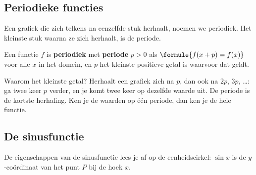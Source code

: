 \subsection{Periodieke functies}

Een grafiek die zich telkens na eenzelfde stuk herhaalt, noemen we periodiek. Het kleinste stuk waarna ze zich herhaalt, is de periode.

\begin{theorie}
Een functie $f$ is \textbf{\textcolor{accent}{periodiek}} met \textbf{\textcolor{accent}{periode}} $p > 0$ als $\formule{f(x + p) = f(x)}$ voor alle $x$ in het domein, en $p$ het kleinste positieve getal is waarvoor dat geldt.
\end{theorie}

Waarom het kleinste getal? Herhaalt een grafiek zich na $p$, dan ook na $2p$, $3p$, \ldots: ga twee keer $p$ verder, en je komt twee keer op dezelfde waarde uit. De periode is de kortste herhaling. Ken je de waarden op één periode, dan ken je de hele functie.


\begin{oefeningen}
\end{oefeningen}

\subsection{De sinusfunctie}

De eigenschappen van de sinusfunctie lees je af op de eenheidscirkel: $\sin x$ is de $y$-coördinaat van het punt $P$ bij de hoek $x$.

